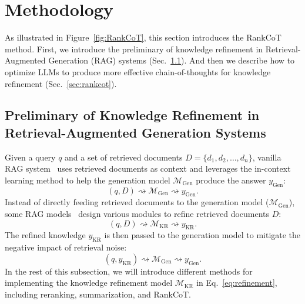 \section{Methodology}
As illustrated in Figure~\ref{fig:RankCoT}, this section introduces the RankCoT method. First, we introduce the preliminary of knowledge refinement in Retrieval-Augmented Generation (RAG) systems (Sec.~\ref{sec:preliminary}). And then we describe how to optimize LLMs to produce more effective chain-of-thoughts for knowledge refinement (Sec.~\ref{sec:rankcot}).



\subsection{Preliminary of Knowledge Refinement in Retrieval-Augmented Generation Systems}\label{sec:preliminary}
Given a query $q$ and a set of retrieved documents $D = \{d_1, d_2, \ldots, d_n\}$, vanilla RAG system~\cite{ram-etal-2023-context} uses retrieved documents as context and leverages the in-context learning method to help the generation model $\mathcal{M}_\text{Gen}$ produce the answer $y_\text{Gen}$:
\begin{equation}
    (q, D) \rightsquigarrow \mathcal{M}_\text{Gen} \rightsquigarrow y_\text{Gen}.
\end{equation}
Instead of directly feeding retrieved documents to the generation model ($\mathcal{M}_\text{Gen}$), some RAG models~\cite{gao2024modular, asai2024selfrag} design various modules to refine retrieved documents $D$:
\begin{equation}\label{eq:refinement}
    (q,D) \rightsquigarrow \mathcal{M}_\text{KR} \rightsquigarrow y_\text{KR}.
\end{equation}
The refined knowledge $y_\text{KR}$ is then passed to the generation model to mitigate the negative impact of retrieval noise:
\begin{equation}
    (q, y_\text{KR}) \rightsquigarrow \mathcal{M}_\text{Gen} \rightsquigarrow y_\text{Gen}.
\end{equation}
In the rest of this subsection, we will introduce different methods for implementing the knowledge refinement model $\mathcal{M}_\text{KR}$ in Eq.~\ref{eq:refinement}, including reranking, summarization, and RankCoT.

